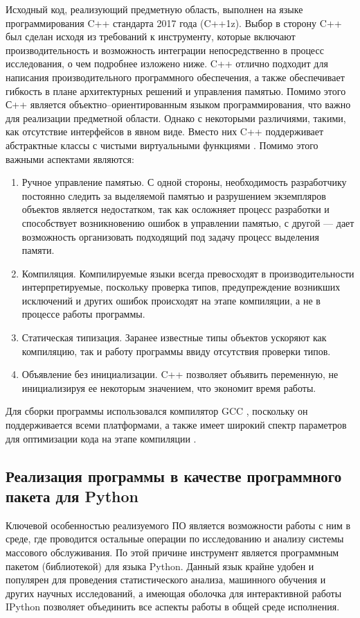  Исходный код, реализующий предметную область, выполнен на языке программирования C++ стандарта 2017 года (C++1z). Выбор в сторону C++ был сделан исходя из требований к инструменту, которые включают производительность и возможность интеграции непосредственно в процесс исследования, о чем подробнее изложено ниже. C++ отлично подходит для написания производительного программного обеспечения, а также обеспечивает гибкость в плане архитектурных решений и управления памятью. Помимо этого С++ является объектно--ориентированным языком программирования, что важно для реализации предметной области. Однако с некоторыми различиями, такими, как отсутствие интерфейсов в явном виде. Вместо них C++ поддерживает абстрактные классы с чистыми виртуальными функциями \cite{schmid2012c++}.
 Помимо этого важными аспектами являются:
 \begin{enumerate}
 	\item Ручное управление памятью. С одной стороны, необходимость разработчику постоянно следить за выделяемой памятью и разрушением экземпляров объектов является недостатком, так как осложняет процесс разработки и способствует возникновению ошибок в управлении памятью, с другой --- дает возможность организовать подходящий под задачу процесс выделения памяти.
 	\item Компиляция. Компилируемые языки всегда превосходят в производительности интерпретируемые, поскольку проверка типов, предупреждение возникших исключений и других ошибок происходят на этапе компиляции, а не в процессе работы программы.
 	\item Статическая типизация. Заранее известные типы объектов ускоряют как компиляцию, так и работу программы ввиду отсутствия проверки типов.
 	\item Объявление без инициализации. C++ позволяет объявить переменную, не инициализируя ее некоторым значением, что экономит время работы.
 \end{enumerate}

 Для сборки программы использовался компилятор GCC \cite{gcc}, поскольку он поддерживается всеми платформами, а также имеет широкий спектр параметров для оптимизации кода на этапе компиляции \cite{branco2015impact}. 
 
 \subsection{Реализация программы в качестве программного пакета для Python}
 Ключевой особенностью реализуемого ПО является возможности работы с ним в среде, где проводится остальные операции по исследованию и анализу системы массового обслуживания. По этой причине инструмент является программным пакетом (библиотекой) для языка Python. Данный язык крайне удобен и популярен для проведения статистического анализа, машинного обучения и других научных исследований, а имеющая оболочка для интерактивной работы IPython позволяет объединить все аспекты работы в общей среде исполнения.
 
